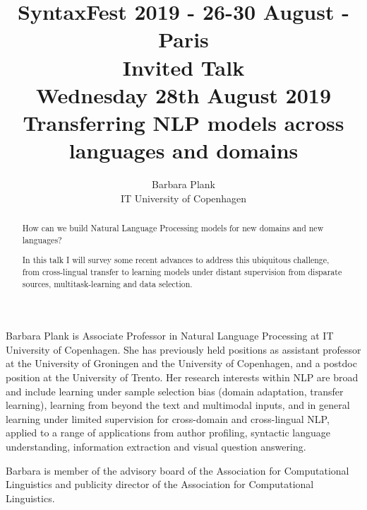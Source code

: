 \documentclass[11pt]{article}
\title{{\footnotesize SyntaxFest 2019 - 26-30 August - Paris}\\
\vspace{10mm}
  Invited Talk\\
  {\small Wednesday 28th August 2019}\\
  Transferring NLP models across languages and domains}
\author{Barbara Plank\\
  IT University of Copenhagen}
\begin{document}
\maketitle
\begin{abstract}
  How can we build Natural Language Processing models for new domains
  and new languages?

  In this talk I will survey some recent advances to
address this ubiquitous challenge, from cross-lingual transfer to
learning models under distant supervision from disparate sources,
multitask-learning and data selection.
\end{abstract}

\vspace{4mm}
\begin{shortbio}
  Barbara Plank is Associate Professor in Natural Language Processing at
IT University of Copenhagen.
She has previously held positions as assistant professor at the
University of Groningen and the University of
Copenhagen, and a postdoc position at the University of Trento. Her
research interests within NLP are broad and include learning under
sample
selection bias (domain adaptation, transfer learning), learning from
beyond the text and multimodal inputs, and in general learning under
limited supervision
for cross-domain and cross-lingual NLP, applied to a range of
applications from author profiling, syntactic language understanding,
information extraction and visual question answering.

Barbara is
member of the advisory board of the Association for Computational
Linguistics and publicity director of the Association for
Computational Linguistics.
\end{shortbio}
\end{document}
